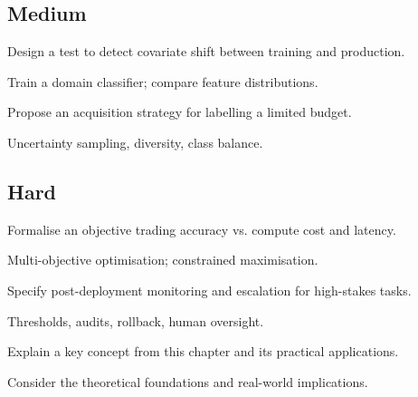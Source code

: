 \subsection*{Medium}

\begin{exercisebox}[medium]
\begin{problem}
Design a test to detect covariate shift between training and production.
\end{problem}
\begin{hintbox}
Train a domain classifier; compare feature distributions.
\end{hintbox}
\end{exercisebox}


\begin{exercisebox}[medium]
\begin{problem}
Propose an acquisition strategy for labelling a limited budget.
\end{problem}
\begin{hintbox}
Uncertainty sampling, diversity, class balance.
\end{hintbox}
\end{exercisebox}


\subsection*{Hard}

\begin{exercisebox}[hard]
\begin{problem}
Formalise an objective trading accuracy vs. compute cost and latency.
\end{problem}
\begin{hintbox}
Multi-objective optimisation; constrained maximisation.
\end{hintbox}
\end{exercisebox}


\begin{exercisebox}[hard]
\begin{problem}
Specify post-deployment monitoring and escalation for high-stakes tasks.
\end{problem}
\begin{hintbox}
Thresholds, audits, rollback, human oversight.
\end{hintbox}
\end{exercisebox}




\begin{exercisebox}[hard]
\begin{problem}
Explain a key concept from this chapter and its practical applications.
\end{problem}
\begin{hintbox}
Consider the theoretical foundations and real-world implications.
\end{hintbox}
\end{exercisebox}


